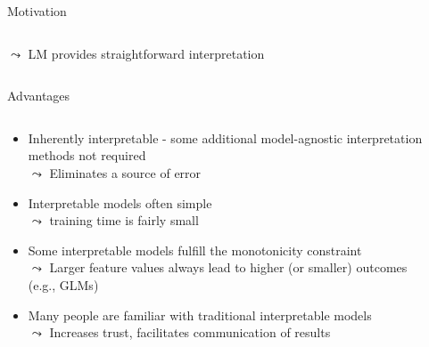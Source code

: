 \documentclass[11pt,compress,t,notes=noshow, aspectratio=169, xcolor=table]{beamer}
\begin{document}
\begin{frame}{Motivation}
\begin{columns}[T, totalwidth = \linewidth]
\begin{column}{0.44\textwidth}
  \begin{center}
    $\leadsto$ LM provides straightforward interpretation
  \end{center}
    \end{column}
\end{columns}
\end{frame}

\begin{frame}{Advantages}
\begin{columns}[T, totalwidth=\textwidth]
\begin{column}{0.72\textwidth}
    \begin{itemize}[<+->]
    \itemsep1em
        \item Inherently interpretable - some additional model-agnostic interpretation methods not required \\
        $\leadsto$ Eliminates a source of error
        \item Interpretable models often simple \\
        $\leadsto$ training time is fairly small
        \item Some interpretable models fulfill the monotonicity constraint \\
        $\leadsto$ Larger feature values always lead to higher (or smaller) outcomes (e.g., GLMs)
        \item Many people are familiar with traditional interpretable models \\
        $\leadsto$ Increases trust, facilitates communication of results
    \end{itemize}
\end{column}
\begin{column}{0.28\textwidth}
    \begin{center}
\end{center}
\end{column}
\end{columns}
\end{frame}
\end{document}
